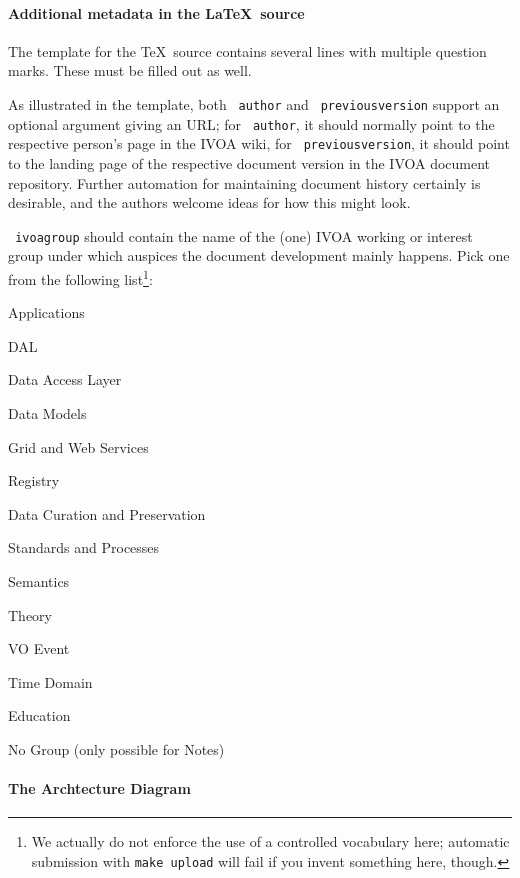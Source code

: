\documentclass[11pt,a4paper]{ivoa}
\newcommand{\texword}[1]{\texttt{\color{texcolor} #1}}
\begin{document}
\paragraph{Additional metadata in the \LaTeX~source}

The template for the \TeX\ source contains several lines with
multiple question marks.  These must be filled out as well.

As illustrated in the template, both \texword{author} and
\texword{previousversion} support an optional argument giving an URL; for
\texword{author}, it should normally point to the respective person's
page in the IVOA wiki, for \texword{previousversion}, it should point to
the landing page of the respective document version in the IVOA document
repository.  Further automation for maintaining document history
certainly is desirable, and the authors welcome ideas for how this might
look.

\texword{ivoagroup} should contain the name of the (one) IVOA working or
interest group under which auspices the document development mainly
happens.  Pick one from the following list\footnote{We actually do not
enforce the use of a controlled vocabulary here; automatic submission
with \texttt{make upload} will fail if you invent something here,
though.}:

\begin{compactitem}
\item Applications
\item DAL
\item Data Access Layer
\item Data Models
\item Grid and Web Services
\item Registry
\item Data Curation and Preservation
\item Standards and Processes
\item Semantics
\item Theory
\item VO Event
\item Time Domain
\item Education
\item No Group (only possible for Notes)
\end{compactitem}


\paragraph{The Archtecture Diagram}
\end{document}
